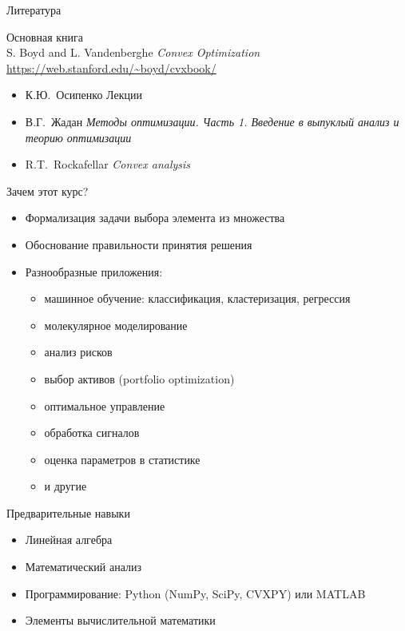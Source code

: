 \documentclass[12pt]{beamer}
\begin{document}
\begin{frame}{Литература}
\begin{center}
Основная книга\\
S. Boyd and L. Vandenberghe \emph{Convex Optimization} \\
\url{https://web.stanford.edu/~boyd/cvxbook/}
\end{center}

\begin{itemize}
\item К.Ю.~Осипенко Лекции
\item В.Г.~Жадан \emph{Методы оптимизации. Часть 1. Введение в выпуклый анализ и теорию оптимизации}
\item R.T.~Rockafellar \emph{Convex analysis}
\end{itemize}
\end{frame}

\begin{frame}{Зачем этот курс?}
\begin{itemize}[<+->]
\item Формализация задачи выбора элемента из множества
\item Обоснование правильности принятия решения
\item Разнообразные приложения:
\begin{itemize}
\item машинное обучение: классификация, кластеризация, регрессия
\item молекулярное моделирование
\item анализ рисков
\item выбор активов (portfolio optimization)
\item оптимальное управление
\item обработка сигналов
\item оценка параметров в статистике 
\item и другие%
\end{itemize}
\end{itemize}
\end{frame}

\begin{frame}{Предварительные навыки}
\begin{itemize}
\item Линейная алгебра
\item Математический анализ
\item Программирование: Python (NumPy, SciPy, CVXPY) или MATLAB
\item Элементы вычислительной математики
\end{itemize}
\end{frame}
\end{document}
